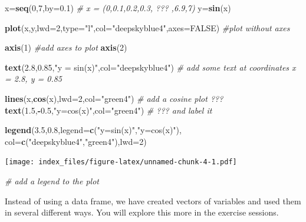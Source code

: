 \documentclass[]{article}
\newenvironment{Shaded}{\begin{snugshade}}{\end{snugshade}}
\newcommand{\CommentTok}[1]{\textcolor[rgb]{0.56,0.35,0.01}{\textit{#1}}}
\newcommand{\DataTypeTok}[1]{\textcolor[rgb]{0.13,0.29,0.53}{#1}}
\newcommand{\DecValTok}[1]{\textcolor[rgb]{0.00,0.00,0.81}{#1}}
\newcommand{\FloatTok}[1]{\textcolor[rgb]{0.00,0.00,0.81}{#1}}
\newcommand{\KeywordTok}[1]{\textcolor[rgb]{0.13,0.29,0.53}{\textbf{#1}}}
\newcommand{\NormalTok}[1]{#1}
\newcommand{\OperatorTok}[1]{\textcolor[rgb]{0.81,0.36,0.00}{\textbf{#1}}}
\newcommand{\OtherTok}[1]{\textcolor[rgb]{0.56,0.35,0.01}{#1}}
\newcommand{\StringTok}[1]{\textcolor[rgb]{0.31,0.60,0.02}{#1}}
\begin{document}
\begin{Shaded}
\begin{Highlighting}[]
\NormalTok{x=}\KeywordTok{seq}\NormalTok{(}\DecValTok{0}\NormalTok{,}\DecValTok{7}\NormalTok{,}\DataTypeTok{by=}\FloatTok{0.1}\NormalTok{)   }
\CommentTok{# x = (0,0.1,0.2,0.3, ??? ,6.9,7)}
\NormalTok{y=}\KeywordTok{sin}\NormalTok{(x)}


\KeywordTok{plot}\NormalTok{(x,y,}\DataTypeTok{lwd=}\DecValTok{2}\NormalTok{,}\DataTypeTok{type=}\StringTok{"l"}\NormalTok{,}\DataTypeTok{col=}\StringTok{"deepskyblue4"}\NormalTok{,}\DataTypeTok{axes=}\OtherTok{FALSE}\NormalTok{) }
\CommentTok{#plot without axes}

\KeywordTok{axis}\NormalTok{(}\DecValTok{1}\NormalTok{) }\CommentTok{#add axes to plot}
\KeywordTok{axis}\NormalTok{(}\DecValTok{2}\NormalTok{)}

\KeywordTok{text}\NormalTok{(}\FloatTok{2.8}\NormalTok{,}\FloatTok{0.85}\NormalTok{,}\StringTok{"y = sin(x)"}\NormalTok{,}\DataTypeTok{col=}\StringTok{"deepskyblue4"}\NormalTok{)   }
\CommentTok{# add some text at coordinates x = 2.8, y = 0.85}

\KeywordTok{lines}\NormalTok{(x,}\KeywordTok{cos}\NormalTok{(x),}\DataTypeTok{lwd=}\DecValTok{2}\NormalTok{,}\DataTypeTok{col=}\StringTok{"green4"}\NormalTok{)  }\CommentTok{# add a cosine plot ???}
\KeywordTok{text}\NormalTok{(}\FloatTok{1.5}\NormalTok{,}\OperatorTok{-}\FloatTok{0.5}\NormalTok{,}\StringTok{"y=cos(x)"}\NormalTok{,}\DataTypeTok{col=}\StringTok{"green4"}\NormalTok{)   }\CommentTok{# ??? and label it}

\KeywordTok{legend}\NormalTok{(}\FloatTok{3.5}\NormalTok{,}\FloatTok{0.8}\NormalTok{,}\DataTypeTok{legend=}\KeywordTok{c}\NormalTok{(}\StringTok{"y=sin(x)"}\NormalTok{,}\StringTok{"y=cos(x)"}\NormalTok{),}
\DataTypeTok{col=}\KeywordTok{c}\NormalTok{(}\StringTok{"deepskyblue4"}\NormalTok{,}\StringTok{"green4"}\NormalTok{),}\DataTypeTok{lwd=}\DecValTok{2}\NormalTok{)   }
\end{Highlighting}
\end{Shaded}

\texttt{[image: index\_files/figure-latex/unnamed-chunk-4-1.pdf]}

\begin{Shaded}
\begin{Highlighting}[]
\CommentTok{# add a legend to the plot}
\end{Highlighting}
\end{Shaded}

Instead of using a data frame, we have created vectors of variables and
used them in several different ways. You will explore this more in the
exercise sessions.
\end{document}
